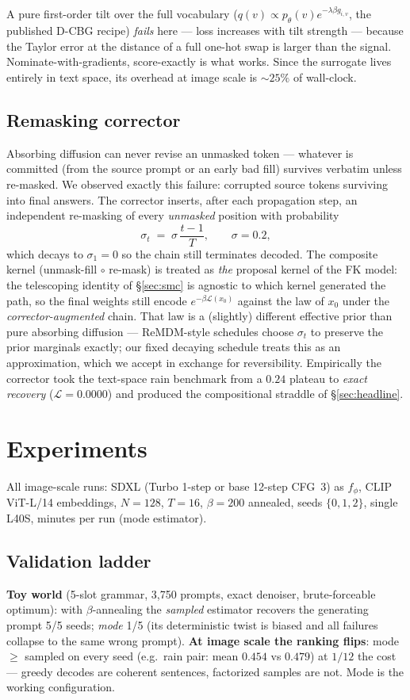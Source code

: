 \documentclass[11pt]{article}
\newcommand{\Ploss}{\mathcal{L}}
\begin{document}
A pure first-order tilt over the full vocabulary
($q(v) \propto p_\theta(v) e^{-\lambda \beta g_{i,v}}$, the published
D-CBG recipe) \emph{fails} here --- loss increases with tilt strength ---
because the Taylor error at the distance of a full one-hot swap is larger
than the signal. Nominate-with-gradients, score-exactly is what works.
Since the surrogate lives entirely in text space, its overhead at image
scale is ${\sim}25\%$ of wall-clock.

\subsection{Remasking corrector}
\label{sec:corrector}
Absorbing diffusion can never revise an unmasked token --- whatever is
committed (from the source prompt or an early bad fill) survives verbatim
unless re-masked. We observed exactly this failure: corrupted source
tokens surviving into final answers. The corrector inserts, after each
propagation step, an independent re-masking of every \emph{unmasked}
position with probability
\begin{equation}
\sigma_t \;=\; \sigma\, \frac{t-1}{T}, \qquad \sigma = 0.2,
\end{equation}
which decays to $\sigma_1 = 0$ so the chain still terminates decoded. The
composite kernel (unmask-fill $\circ$ re-mask) is treated as \emph{the}
proposal kernel of the FK model: the telescoping identity of
\S\ref{sec:smc} is agnostic to which kernel generated the path, so the
final weights still encode $e^{-\beta \Ploss(x_0)}$ against the law of
$x_0$ under the \emph{corrector-augmented} chain. That law is a
(slightly) different effective prior than pure absorbing diffusion ---
ReMDM-style schedules choose $\sigma_t$ to preserve the prior marginals
exactly; our fixed decaying schedule treats this as an approximation, which
we accept in exchange for reversibility. Empirically the corrector took
the text-space rain benchmark from a $0.24$ plateau to \emph{exact
recovery} ($\Ploss = 0.0000$) and produced the compositional straddle of
\S\ref{sec:headline}.

\section{Experiments}
All image-scale runs: SDXL (Turbo 1-step or base 12-step CFG~3) as
$f_\phi$, CLIP ViT-L/14 embeddings, $N{=}128$, $T{=}16$, $\beta{=}200$
annealed, seeds $\{0,1,2\}$, single L40S, minutes per run (mode
estimator).

\subsection{Validation ladder}
\textbf{Toy world} (5-slot grammar, 3{,}750 prompts, exact denoiser,
brute-forceable optimum): with $\beta$-annealing the \emph{sampled}
estimator recovers the generating prompt 5/5 seeds; \emph{mode} 1/5 (its
deterministic twist is biased and all failures collapse to the same wrong
prompt). \textbf{At image scale the ranking flips}: mode $\geq$ sampled on
every seed (e.g.\ rain pair: mean $0.454$ vs $0.479$) at $1/12$ the cost
--- greedy decodes are coherent sentences, factorized samples are not.
Mode is the working configuration.
\end{document}
